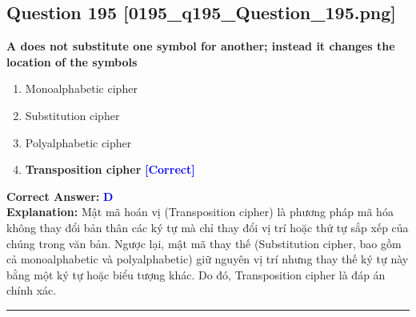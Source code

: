 \documentclass[11pt,a4paper]{article}
\begin{document}
\begin{minipage}{\textwidth}
\subsection*{Question 195 \quad \footnotesize{[0195\_q195\_Question\_195.png]}}
\noindent \textbf{A does not substitute one symbol for another; instead it changes the location of the symbols}

\begin{enumerate}[label=\Alph*.]
    \item Monoalphabetic cipher
    \item Substitution cipher
    \item Polyalphabetic cipher
    \item \textbf{Transposition cipher} \hfill \textcolor{blue}{\textbf{[Correct]}}
\end{enumerate}

\noindent \textbf{Correct Answer:} \textcolor{blue}{\textbf{D}} \\[2pt]
\noindent \textbf{Explanation:} Mật mã hoán vị (Transposition cipher) là phương pháp mã hóa không thay đổi bản thân các ký tự mà chỉ thay đổi vị trí hoặc thứ tự sắp xếp của chúng trong văn bản. Ngược lại, mật mã thay thế (Substitution cipher, bao gồm cả monoalphabetic và polyalphabetic) giữ nguyên vị trí nhưng thay thế ký tự này bằng một ký tự hoặc biểu tượng khác. Do đó, Transposition cipher là đáp án chính xác.

\par\vspace{0.3cm}
\hrule
\vspace{0.3cm}
\end{minipage}
\end{document}
